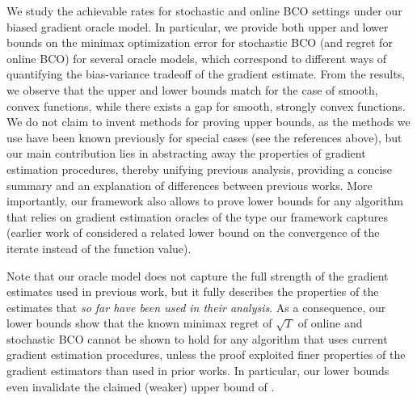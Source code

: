 We study the achievable rates for stochastic and online BCO settings under our biased gradient oracle model.  %
In particular, we provide both upper and lower bounds on the minimax optimization error for stochastic BCO (and regret for online BCO) for several oracle models, which correspond to different ways of quantifying the bias-variance tradeoff of the gradient estimate. From the results, we observe that the upper and lower bounds match for the case of smooth, convex functions, while there exists a gap for smooth, strongly convex functions. 
We do not claim to invent methods for proving upper bounds, as the methods we use have been known previously for special cases  (see the references above),
but our main contribution lies in abstracting away the properties of gradient estimation procedures, 
thereby unifying previous analysis, providing a concise summary and an explanation of differences between previous works.
More importantly, our framework also allows to prove lower bounds for any algorithm that relies on gradient
estimation oracles of the type our framework captures
(earlier work of \citealp{Chen88:LB-AoS} considered a related lower bound on the convergence of the iterate instead of the function value).

Note that our oracle model does not capture the full strength of the gradient estimates used in previous work, but it fully describes the properties of the estimates that \emph{so far have been used in their analysis}.
As a consequence, our lower bounds show that the known minimax regret of $\sqrt{T}$ \citep{BubeckDKP15,BuEl15,shamir2012complexity}
of online and stochastic BCO
cannot be shown to hold
for any algorithm that uses current gradient estimation procedures, unless the proof exploited finer properties
of the gradient estimators than used in prior works. In particular,
our lower bounds even invalidate the claimed (weaker) upper bound of \citet{DeElKo15}.

